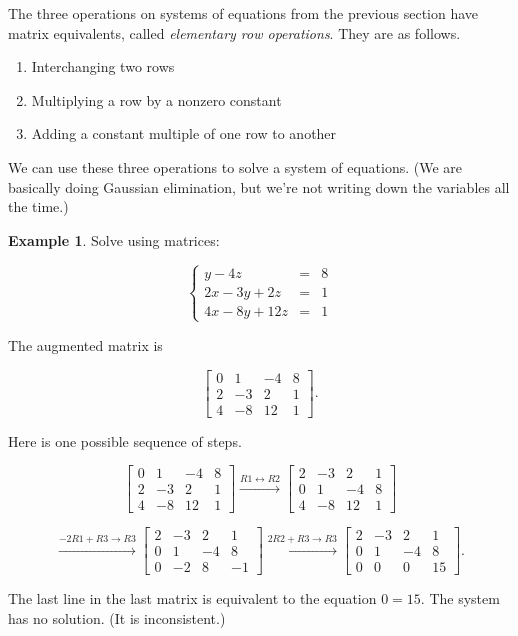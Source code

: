 \documentclass[
]{book}
\providecommand{\tightlist}{%
  \setlength{\itemsep}{0pt}\setlength{\parskip}{0pt}}
\theoremstyle{definition}
\theoremstyle{definition}
\newtheorem{example}{Example}[chapter]
\theoremstyle{definition}
\theoremstyle{definition}
\theoremstyle{remark}
\begin{document}
The three operations on systems of equations from the previous section have matrix equivalents, called \emph{elementary row operations}. They are as follows.

\begin{enumerate}
\def\labelenumi{\arabic{enumi}.}
\tightlist
\item
  Interchanging two rows
\item
  Multiplying a row by a nonzero constant
\item
  Adding a constant multiple of one row to another
\end{enumerate}

We can use these three operations to solve a system of equations. (We are basically doing Gaussian elimination, but we're not writing down the variables all the time.)

\begin{examplebox}

\begin{example}
Solve using matrices:

\[ \left\{ \begin{array}{rcl}
y-4z&=&8\\
    2x-3y+2z&=&1\\
    4x-8y+12z&=&1 \end{array} \right. \]

The augmented matrix is

\[\left[\begin{array}{rrr|r}
0&1&-4&8\\
2 & -3 & 2 & 1\\
4 & -8 & 12 & 1
\end{array}\right].\]

Here is one possible sequence of steps.

\[\left[\begin{array}{rrr|r}
0&1&-4&8\\
2 & -3 & 2 & 1\\
4 & -8 & 12 & 1
\end{array}\right] \xrightarrow{R1\leftrightarrow R2} 
\left[\begin{array}{rrr|r}
2 & -3 & 2 & 1\\
0 & 1 & -4 & 8\\
4 & -8 & 12 & 1
\end{array}\right]\]

\[\xrightarrow{-2R1+R3\to R3}
\left[\begin{array}{rrr|r}
2 & -3 & 2 & 1\\
0 & 1 & -4 & 8 \\
0 & -2 & 8 & -1
\end{array}\right]\xrightarrow{2R2+R3\to R3}
\left[\begin{array}{rrr|r}
2 & -3 & 2 & 1\\
0 & 1 & -4 & 8 \\
0 & 0 & 0 & 15
\end{array}\right].
\]

The last line in the last matrix is equivalent to the equation \(0=15\). The system has no solution. (It is inconsistent.)
\end{example}

\end{examplebox}
\end{document}
